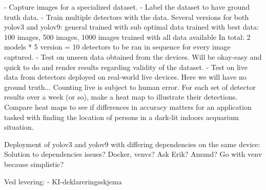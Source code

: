 - Capture images for a specialized dataset.
- Label the dataset to have ground truth data.
- Train multiple detectors with the data.
	Several versions for both yolov3 and yolov9:
		general
		trained with sub optimal data
		trained with best data:
			100 images, 500 images, 1000 images
		trained with all data available
	In total: 2 models * 5 version = 10 detectors to be ran in sequence for every image captured. 
- Test on unseen data obtained from the devices.
	Will be okay-easy and quick to do and render results regarding validity of the dataset. 
- Test on live data from detectors deployed on real-world live devices.
	Here we will have no ground truth... Counting live is subject to human error. 
	For each set of detector results over a week (or so), make a heat map to illustrate their detections. Compare heat maps to see if differences in accuracy matters for an application tasked with finding the location of persons in a dark-lit indoors acquarium situation.

	Deployment of yolov3 and yolov9 with differing dependencies on the same device:
	Solution to dependencies issues? Docker, venvs?	Ask Erik? Amund? Go with venv because simplistic?





Ved levering:
- KI-deklareringsskjema